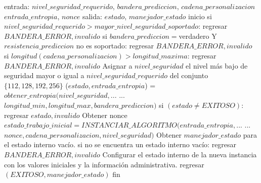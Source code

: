 \begin{description}
\begin{pseudocodigo}[caption={DRBG, instanciación.}, label={drbg:1}]
  entrada:  $nivel\_seguridad\_requerido$, $bandera\_prediccion$, $cadena\_personalizacion$
            $entrada\_entropia$, $nonce$
  salida:   $estado$, $manejador\_estado$
  inicio
    si $nivel\_seguridad\_requerido > mayor\_nivel\_seguridad\_soportado$:
      regresar $BANDERA\_ERROR, invalido$
    si $bandera\_prediccion = $verdadero Y $resistencia\_prediccion$ no es soportado:
      regresar $BANDERA\_ERROR, invalido$
    si $longitud(cadena\_personalizacion) > longitud\_maxima$:
      regresar $BANDERA\_ERROR, invalido$
    Asignar a $nivel\_seguridad$ el nivel más bajo de seguridad mayor o igual
      a $nivel\_seguridad\_requerido$ del conjunto $\{112, 128, 192, 256\}$
    ($estado, entrada\_entropia$) = $obtener\_entropia(nivel\_seguridad,$...
      ... $longitud\_min, longitud\_max, bandera\_prediccion)$
    si $(estado \neq EXITOSO)$:
      regresar $estado, invalido$
    Obtener nonce
    $estado\_trabajo\_inicial = INSTANCIAR\_ALGORITMO(entrada\_entropia,$...
      ... $nonce, cadena\_personalizacion, nivel\_seguridad)$
    Obtener $manejador\_estado$ para el estado interno vacío. 
    si no se encuentra un estado interno vacío:
      regresar $BANDERA\_ERROR, invalido$
    Configurar el estado interno de la nueva instancia con los valores iniciales
      y la información administrativa.
    regresar $(EXITOSO, manejador\_estado)$
  fin
\end{pseudocodigo}


\end{description}
